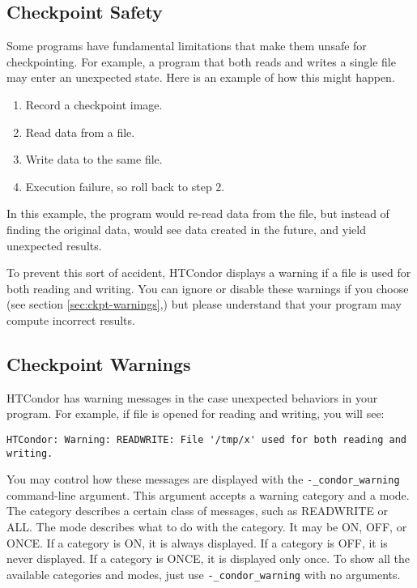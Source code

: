 \subsection{\label{sec:ckpt-safety}Checkpoint Safety}

Some programs have fundamental limitations that make them
unsafe for checkpointing.  For example, a program that both reads
and writes a single file may enter an unexpected state. Here
is an example of how this might happen.

\begin{enumerate}
\item Record a checkpoint image.
\item Read data from a file.
\item Write data to the same file.
\item Execution failure, so roll back to step 2.
\end{enumerate}

In this example, the program would re-read data from the file, but
instead of finding the original data, would see data created in the
future, and yield unexpected results.

To prevent this sort of accident, HTCondor displays a warning
if a file is used for both reading and writing.  You can ignore or disable
these warnings if you choose (see section \ref{sec:ckpt-warnings},) but
please understand that your program may compute incorrect results.

\subsection{\label{sec:ckpt-warnings}Checkpoint Warnings}

HTCondor has warning messages in the case unexpected
behaviors in your program.  For example, if file 
is opened for reading
and writing, you will see:

\footnotesize
\begin{verbatim}
HTCondor: Warning: READWRITE: File '/tmp/x' used for both reading and writing.
\end{verbatim}
\normalsize

You may control how these messages are displayed with the
\verb$-_condor_warning$ command-line argument.  This argument
accepts a warning category and a mode.  The category describes a certain
class of messages, such as READWRITE or ALL.  The mode describes what
to do with the category.  It may be ON, OFF, or ONCE.
If a category is ON, it is always displayed.
If a category is OFF, it is never displayed.
If a category is ONCE, it is displayed only once.
To show all the available categories and modes, just use
\verb$-_condor_warning$ with no arguments.

